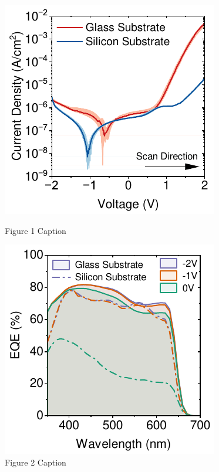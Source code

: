 \begin{figure}[h!]
    \centering
    \begin{minipage}{0.48\textwidth}
        \centering
        \includegraphics[width=\textwidth]{chapters/material_properties/images/JV_PIX_Glass.pdf} %
        \caption{Figure 1 Caption}
        \label{fig:figure1}
    \end{minipage}
    \hfill
    \begin{minipage}{0.48\textwidth}
        \centering
        \includegraphics[width=\textwidth]{chapters/material_properties/images/EQE_fnm_PIX_Glass.pdf} %
        \caption{Figure 2 Caption}
        \label{fig:figure2}
    \end{minipage}


\end{figure}
